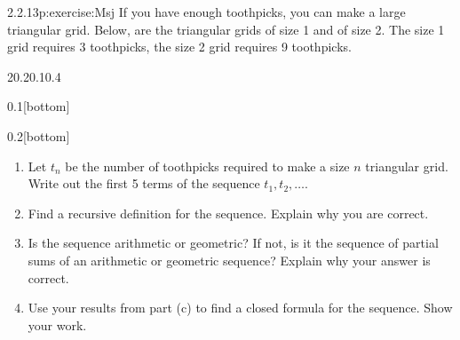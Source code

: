 \documentclass[twoside,11pt,]{book}
\numberwithin{equation}{chapter}
\begin{document}
\begin{divisionsolution}{2.2.13}{}{p:exercise:Msj}%
If you have enough toothpicks, you can make a large triangular grid. Below, are the triangular grids of size 1 and of size 2. The size 1 grid requires 3 toothpicks, the size 2 grid requires 9 toothpicks.%
\begin{sidebyside}{2}{0.2}{0.1}{0.4}%
\begin{sbspanel}{0.1}[bottom]%
%
\end{sbspanel}%
\begin{sbspanel}{0.2}[bottom]%
%
\end{sbspanel}%
\end{sidebyside}%
\par
%
\begin{enumerate}[label=(\alph*)]
\item{}Let \(t_n\) be the number of toothpicks required to make a size \(n\) triangular grid. Write out the first 5 terms of the sequence \(t_1, t_2, \ldots\). %
\item{}Find a recursive definition for the sequence. Explain why you are correct. %
\item{}Is the sequence arithmetic or geometric? If not, is it the sequence of partial sums of an arithmetic or geometric sequence? Explain why your answer is correct. %
\item{}Use your results from part (c) to find a closed formula for the sequence. Show your work. %
\end{enumerate}
%
\end{divisionsolution}%
\end{document}
